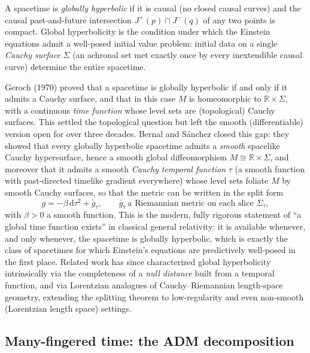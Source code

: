 \documentclass[11pt]{article}
\newcommand{\dd}{\mathrm{d}}
\begin{document}
A spacetime is \emph{globally hyperbolic} if it is causal (no closed causal curves) and the causal past-and-future intersection $J^+(p)\cap J^-(q)$ of any two points is compact. Global hyperbolicity is the condition under which the Einstein equations admit a well-posed initial value problem: initial data on a single \emph{Cauchy surface} $\Sigma$ (an achronal set met exactly once by every inextendible causal curve) determine the entire spacetime.

Geroch (1970) proved that a spacetime is globally hyperbolic if and only if it admits a Cauchy surface, and that in this case $M$ is homeomorphic to $\mathbb{R}\times\Sigma$, with a continuous \emph{time function} whose level sets are (topological) Cauchy surfaces. This settled the topological question but left the smooth (differentiable) version open for over three decades. Bernal and S\'anchez closed this gap: they showed that every globally hyperbolic spacetime admits a \emph{smooth} spacelike Cauchy hypersurface, hence a smooth global diffeomorphism $M\cong \mathbb{R}\times\Sigma$, and moreover that it admits a smooth \emph{Cauchy temporal function} $\tau$ (a smooth function with past-directed timelike gradient everywhere) whose level sets foliate $M$ by smooth Cauchy surfaces, so that the metric can be written in the split form
\begin{equation}
g = -\beta\, \dd\tau^2 + \bar g_\tau, \qquad \bar g_\tau \ \text{a Riemannian metric on each slice } \Sigma_\tau,
\label{eq:splitting}
\end{equation}
with $\beta>0$ a smooth function. This is the modern, fully rigorous statement of ``a global time function exists'' in classical general relativity: it is available whenever, and only whenever, the spacetime is globally hyperbolic, which is exactly the class of spacetimes for which Einstein's equations are predictively well-posed in the first place. Related work has since characterized global hyperbolicity intrinsically via the completeness of a \emph{null distance} built from a temporal function, and via Lorentzian analogues of Cauchy--Riemannian length-space geometry, extending the splitting theorem to low-regularity and even non-smooth (Lorentzian length space) settings.

\subsection{Many-fingered time: the ADM decomposition}
\label{ssec:adm}
\end{document}
